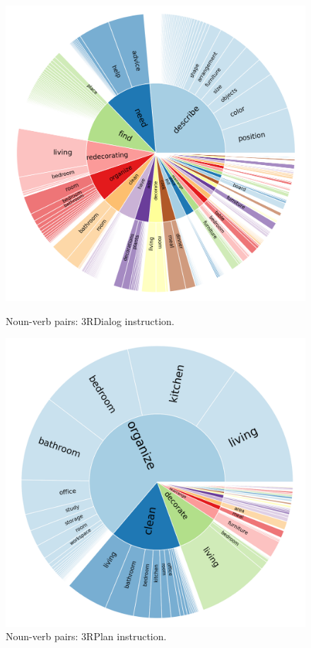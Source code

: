 \begin{figure}[t!]
    \centering
    \begin{minipage}[b]{0.45\textwidth}
        \includegraphics[width=1\textwidth]{figs/Rscan_dialogue_noun_verb_instruction_stat.png}
        \caption{Noun-verb pairs: 3RDialog instruction.}
        \label{fig:RscanDialog_noun_verb_instruction}
    \end{minipage}
    \hfill
    \begin{minipage}[b]{0.46\textwidth}
        \includegraphics[width=1\textwidth]{figs/Rscan_plan_noun_verb_instruction_stat.png}
        \caption{Noun-verb pairs: 3RPlan instruction.}
        \label{fig:RscanPlan_noun_verb_instruction}
    \end{minipage}
\end{figure}   


